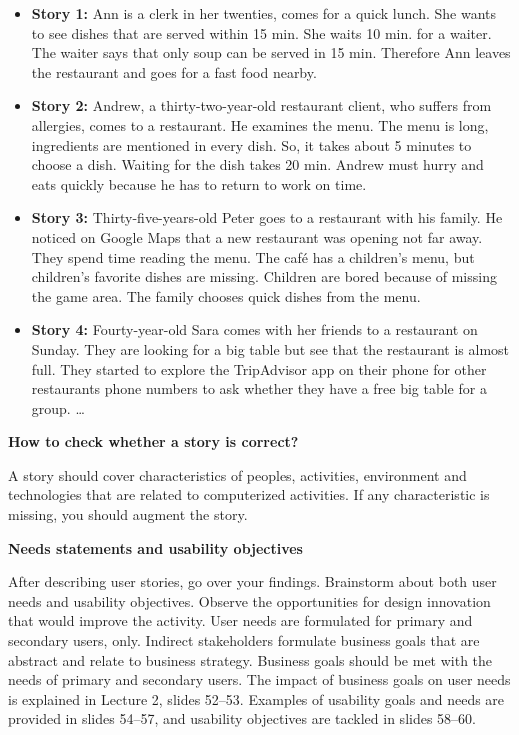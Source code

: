 \documentclass[]{VUMIFTemplateClass}
\begin{document}
\begin{itemize}
    \item \textbf{Story 1:} Ann is a clerk in her twenties, comes for a quick
    lunch. She wants to see dishes that are served within 15 min. She waits 10
    min. for a waiter. The waiter says that only soup can be served in 15 min.
    Therefore Ann leaves the restaurant and goes for a fast food nearby. \checkmark
    
    \item \textbf{Story 2:} Andrew, a thirty-two-year-old restaurant client, who
    suffers from allergies, comes to a restaurant. He examines the menu. The
    menu is long, ingredients are mentioned in every dish. So, it takes about 5
    minutes to choose a dish. Waiting for the dish takes 20 min. Andrew must
    hurry and eats quickly because he has to return to work on time. \checkmark
    
    \item \textbf{Story 3:} Thirty-five-years-old Peter goes to a restaurant
    with his family. He noticed on Google Maps that a new restaurant was opening
    not far away. They spend time reading the menu. The café has a children's
    menu, but children's favorite dishes are missing. Children are bored because
    of missing the game area. The family chooses quick dishes from the menu. \checkmark
    
    \item \textbf{Story 4:} Fourty-year-old Sara comes with her friends to a
    restaurant on Sunday. They are looking for a big table but see that the
    restaurant is almost full. They started to explore the TripAdvisor app on
    their phone for other restaurants phone numbers to ask whether they have a
    free big table for a group. \ldots \checkmark
\end{itemize}

\textbf{How to check whether a story is correct?} \checkmark

A story should cover
characteristics of peoples, activities, environment and technologies that are
related to computerized activities. If any characteristic is missing, you should
augment the story. \checkmark

\textbf{Needs statements and usability objectives} 
 
After describing user stories, go over your findings. Brainstorm about both user
needs and usability objectives. Observe the opportunities for design innovation
that would improve the activity. User needs are formulated for primary and
secondary users, only. Indirect stakeholders formulate business goals that are
abstract and relate to business strategy. Business goals should be met with the
needs of primary and secondary users. The impact of business goals on user needs
is explained in Lecture 2, slides 52–53. Examples of usability goals and needs
are provided in slides 54--57, and usability objectives are tackled in slides
58--60. 
\end{document}
